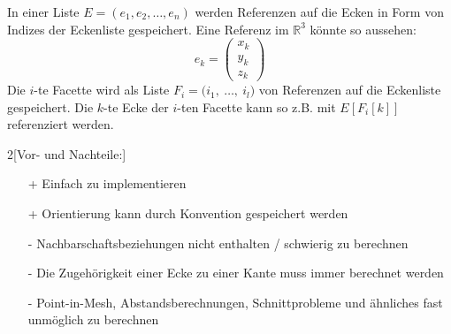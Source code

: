\begin{Definition}[Eckenliste]

In einer Liste $E = (e_1, e_2, \hdots, e_n)$ werden Referenzen auf die Ecken in Form von Indizes der Eckenliste gespeichert. 
Eine Referenz im $\mathbb{R}^3$ könnte so aussehen: 
\begin{equation*}
    e_k = \begin{pmatrix}
        x_k \\
        y_k \\
        z_k
    \end{pmatrix}
\end{equation*}
Die $i$-te Facette wird als Liste $F_i = \bigl( i_1,~\hdots,~i_l  \bigr)$ von 
Referenzen auf die Eckenliste gespeichert. 
Die $k$-te Ecke der $i$-ten Facette kann so z.B. mit $E[F_i[k]]$ referenziert 
werden. 
\end{Definition}
\begin{multicols}{2}[Vor- und Nachteile:]
    \begin{itemize}
        \item[+] Einfach zu implementieren
        \item[+] Orientierung kann durch Konvention gespeichert werden
        \vspace{60pt}
        \item[-] Nachbarschaftsbeziehungen nicht enthalten / schwierig zu 
                 berechnen
        \item[-] Die Zugehörigkeit einer Ecke zu einer Kante muss immer 
                 berechnet werden
        \item[-] Point-in-Mesh, Abstandsberechnungen,  Schnittprobleme und ähnliches fast unmöglich zu berechnen
    \end{itemize}
\end{multicols}

